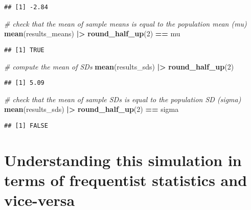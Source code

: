\documentclass[
]{article}
\newenvironment{Shaded}{\begin{snugshade}}{\end{snugshade}}
\newcommand{\CommentTok}[1]{\textcolor[rgb]{0.56,0.35,0.01}{\textit{#1}}}
\newcommand{\DecValTok}[1]{\textcolor[rgb]{0.00,0.00,0.81}{#1}}
\newcommand{\FunctionTok}[1]{\textcolor[rgb]{0.13,0.29,0.53}{\textbf{#1}}}
\newcommand{\NormalTok}[1]{#1}
\newcommand{\SpecialCharTok}[1]{\textcolor[rgb]{0.81,0.36,0.00}{\textbf{#1}}}
\begin{document}
\begin{verbatim}
## [1] -2.84
\end{verbatim}

\begin{Shaded}
\begin{Highlighting}[]
\CommentTok{\# check that the mean of sample means is equal to the population mean (mu)}
\FunctionTok{mean}\NormalTok{(results\_means) }\SpecialCharTok{|\textgreater{}} \FunctionTok{round\_half\_up}\NormalTok{(}\DecValTok{2}\NormalTok{) }\SpecialCharTok{==}\NormalTok{ mu}
\end{Highlighting}
\end{Shaded}

\begin{verbatim}
## [1] TRUE
\end{verbatim}

\begin{Shaded}
\begin{Highlighting}[]
\CommentTok{\# compute the mean of SDs}
\FunctionTok{mean}\NormalTok{(results\_sds) }\SpecialCharTok{|\textgreater{}} \FunctionTok{round\_half\_up}\NormalTok{(}\DecValTok{2}\NormalTok{)}
\end{Highlighting}
\end{Shaded}

\begin{verbatim}
## [1] 5.09
\end{verbatim}

\begin{Shaded}
\begin{Highlighting}[]
\CommentTok{\# check that the mean of sample SDs is equal to the population SD (sigma)}
\FunctionTok{mean}\NormalTok{(results\_sds) }\SpecialCharTok{|\textgreater{}} \FunctionTok{round\_half\_up}\NormalTok{(}\DecValTok{2}\NormalTok{) }\SpecialCharTok{==}\NormalTok{ sigma}
\end{Highlighting}
\end{Shaded}

\begin{verbatim}
## [1] FALSE
\end{verbatim}

\hypertarget{understanding-this-simulation-in-terms-of-frequentist-statistics-and-vice-versa}{%
\section{Understanding this simulation in terms of frequentist
statistics and
vice-versa}\label{understanding-this-simulation-in-terms-of-frequentist-statistics-and-vice-versa}}
\end{document}
